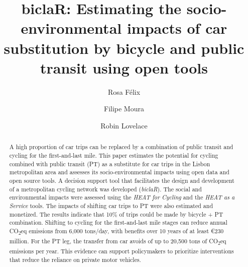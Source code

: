 \documentclass[runningheads]{llncs}
\begin{document}
\title{biclaR: Estimating the socio-environmental impacts of car
substitution by bicycle and public transit using open tools}
%
%
\author{Rosa Félix \and Filipe
Moura \and Robin
Lovelace}


%


\maketitle              %
%
\begin{abstract}
A high proportion of car trips can be replaced by a combination of
public transit and cycling for the first-and-last mile. This paper
estimates the potential for cycling combined with public transit (PT) as
a substitute for car trips in the Lisbon metropolitan area and assesses
its socio-environmental impacts using open data and open source tools. A
decision support tool that facilitates the design and development of a
metropolitan cycling network was developed (\emph{biclaR}). The social
and environmental impacts were assessed using the \emph{HEAT for
Cycling} and the \emph{HEAT as a Service} tools. The impacts of shifting
car trips to PT were also estimated and monetized. The results indicate
that 10\% of trips could be made by bicycle + PT combination. Shifting
to cycling for the first-and-last mile stages can reduce annual
CO\textsubscript{2}eq emissions from 6,000 tons/day, with benefits over
10 years of at least €230 million. For the PT leg, the transfer from car
avoids of up to 20,500 tons of CO\textsubscript{2}eq emissions per year.
This evidence can support policymakers to prioritize interventions that
reduce the reliance on private motor vehicles.


\end{abstract}
\end{document}
